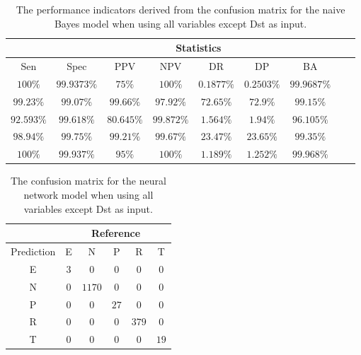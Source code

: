 \begin{table}[!ht]
	\centering
	\begin{tabular}{|c|c|c|c|c|c|c|c|c|}
		\hline
		 & \multicolumn{7}{c|}{Statistics} \\ \hline
		Sen & Spec & PPV & NPV & DR & DP & BA \\ \hline
		$100\%$ & $99.9373\%$ & $75\%$ & $100\%$ & $0.1877\%$ & $0.2503\%$ & $99.9687\%$ \\ \hline
		$99.23\%$ & $99.07\%$ & $99.66\%$ & $97.92\%$ & $72.65\%$ & $72.9\%$ & $99.15\%$ \\ \hline
		$92.593\%$ & $99.618\%$ & $80.645\%$ & $99.872\%$ & $1.564\%$ & $1.94\%$ & $96.105\%$ \\ \hline
		$98.94\%$ & $99.75\%$ & $99.21\%$ & $99.67\%$ & $23.47\%$ & $23.65\%$ & $99.35\%$ \\ \hline
		$100\%$ & $99.937\%$ & $95\%$ & $100\%$ & $1.189\%$ & $1.252\%$ & $99.968\%$ \\ \hline
	\end{tabular}
	\caption{The performance indicators derived from the confusion matrix for the naive Bayes model when using all variables except Dst as input.}
	\label{tab:cs:noDst:nb}
\end{table}

\begin{table}[!ht]
	\centering
	\begin{tabular}{|c|c|c|c|c|c|}
		\hline
		 & \multicolumn{5}{|c|}{Reference} \\ \hline
		 Prediction & E & N & P & R & T \\ \hline
		 E & $3$ & $0$ & $0$ & $0$ & $0$ \\ \hline
		 N & $0$ & $1170$ & $0$ & $0$ & $0$ \\ \hline
		 P & $0$ & $0$ & $27$ & $0$ & $0$ \\ \hline
		 R & $0$ & $0$ & $0$ & $379$ & $0$ \\ \hline
		 T & $0$ & $0$ & $0$ & $0$ & $19$ \\ \hline
	\end{tabular}
	\caption{The confusion matrix for the neural network model when using all variables except Dst as input.}
	\label{tab:cm:noDst:nnet}
\end{table}

